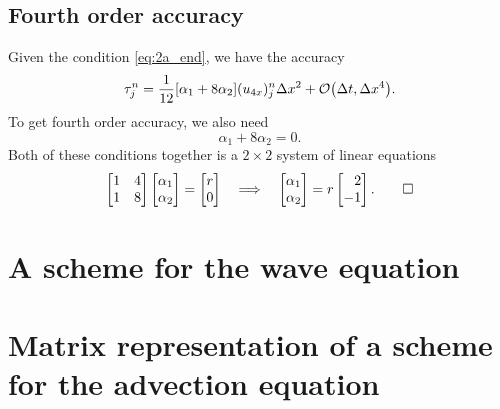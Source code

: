\documentclass[11pt,letter, swedish, english
]{article}
\newcommand{\Dx}{\ensuremath{\Delta{x}}}
\newcommand{\Dt}{\ensuremath{\Delta{t}}}
\begin{document}
\subsection{Fourth order accuracy}
Given the condition \eqref{eq:2a_end}, we have the accuracy
\begin{equation}
\tau_j^n=\frac{1}{12}[\alpha_1+8\alpha_2](u_{4x})_j^n\Dx^2
+\order{\Dt, \Dx^4}.
\end{equation}
To get fourth order accuracy, we also need
\begin{equation}
\alpha_1+8\alpha_2=0.
\end{equation}
Both of these conditions together is a $2\times2$ system of linear
equations 
\begin{equation}
\begin{bmatrix}1&4\\1&8\end{bmatrix}
\begin{bmatrix}\alpha_1\\\alpha_2\end{bmatrix}
=\begin{bmatrix}r\\0\end{bmatrix}
\quad\Longrightarrow\quad
\begin{bmatrix}\alpha_1\\\alpha_2\end{bmatrix}
=r\begin{bmatrix*}[r]
2\\-1
\end{bmatrix*}.
\qed
\end{equation}


\section{A scheme for the wave equation}











\section{Matrix representation of a scheme for the advection equation}
\end{document}
